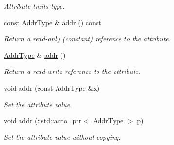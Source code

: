 \begin{DoxyCompactItemize}
\begin{DoxyCompactList}\small\item\em Attribute traits type. \item\end{DoxyCompactList}\item 
const \hyperlink{classopenstack_1_1xml_1_1Address_a768e0cf6818885dce0dc9df43a283011}{AddrType} \& \hyperlink{classopenstack_1_1xml_1_1Address_a437fcf4afcc2c589f64d0a4f7f3b73db}{addr} () const 
\begin{DoxyCompactList}\small\item\em Return a read-\/only (constant) reference to the attribute. \item\end{DoxyCompactList}\item 
\hyperlink{classopenstack_1_1xml_1_1Address_a768e0cf6818885dce0dc9df43a283011}{AddrType} \& \hyperlink{classopenstack_1_1xml_1_1Address_afb1657caf2820e54a57fc6f65369259f}{addr} ()
\begin{DoxyCompactList}\small\item\em Return a read-\/write reference to the attribute. \item\end{DoxyCompactList}\item 
void \hyperlink{classopenstack_1_1xml_1_1Address_a5ff00da68a583e0409745f68a075fe6c}{addr} (const \hyperlink{classopenstack_1_1xml_1_1Address_a768e0cf6818885dce0dc9df43a283011}{AddrType} \&x)
\begin{DoxyCompactList}\small\item\em Set the attribute value. \item\end{DoxyCompactList}\item 
void \hyperlink{classopenstack_1_1xml_1_1Address_ab91fce4a2289759da1aee70d21b00780}{addr} (::std::auto\_\-ptr$<$ \hyperlink{classopenstack_1_1xml_1_1Address_a768e0cf6818885dce0dc9df43a283011}{AddrType} $>$ p)
\begin{DoxyCompactList}\small\item\em Set the attribute value without copying. \item\end{DoxyCompactList}\end{DoxyCompactItemize}
